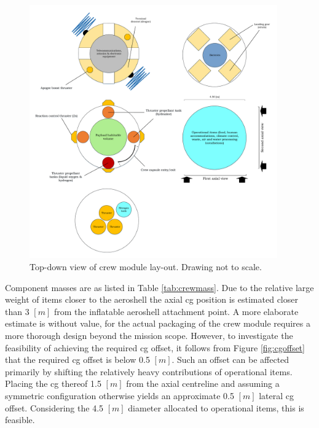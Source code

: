 \begin{figure}[ht]
		\centering
		\includegraphics[width=0.95\textwidth]{./Figure/CrewModule/TopviewV2.pdf}
		\caption[Top-down view of crew module lay-out]{Top-down view of crew module lay-out. Drawing not to scale.}
		\label{fig:topview}
\end{figure}

Component masses are as listed in Table \ref{tab:crewmass}. Due to the relative large weight of items closer to the aeroshell the axial \gls{cg} position is estimated closer than 3 $[m]$ from the inflatable aeroshell attachment point. A more elaborate estimate is without value, for the actual packaging of the crew module requires a more thorough design beyond the mission scope. However, to investigate the feasibility of achieving the required \gls{cg} offset, it follows from Figure \ref{fig:cgoffset} that the required \gls{cg} offset is below 0.5 $[m]$. Such an offset can be affected primarily by shifting the relatively heavy contributions of operational items. Placing the \gls{cg} thereof 1.5 $[m]$ from the axial centreline and assuming a symmetric configuration otherwise yields an approximate 0.5 $[m]$ lateral \gls{cg} offset. Considering the 4.5 $[m]$ diameter allocated to operational items, this is feasible. %


